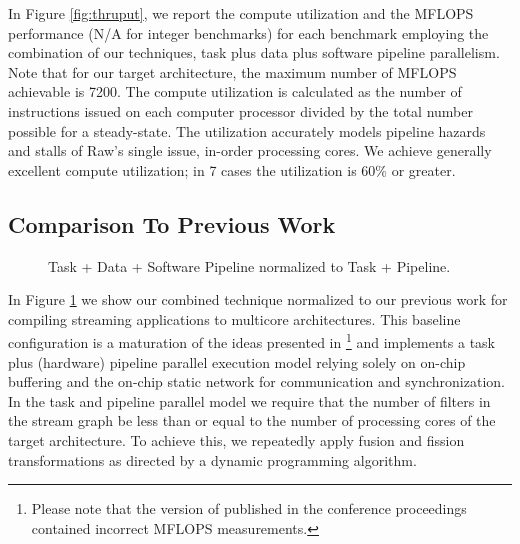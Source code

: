 In Figure \ref{fig:thruput}, we report the compute utilization and the
MFLOPS performance (N/A for integer benchmarks) for each benchmark
employing the combination of our techniques, task plus data plus
software pipeline parallelism. Note that for our target architecture,
the maximum number of MFLOPS achievable is 7200.  The compute
utilization is calculated as the number of instructions issued on each
computer processor divided by the total number possible for a
steady-state.  The utilization accurately models pipeline hazards and
stalls of Raw's single issue, in-order processing cores.  We achieve
generally excellent compute utilization; in 7 cases the utilization is
60\% or greater.


\subsection{Comparison To Previous Work}

\begin{figure}[t]
\centering
{}
\caption{Task + Data + Software Pipeline normalized to Task + Pipeline.
\protect\label{fig:vs-space}}
\vspace{-6pt}
\end{figure}

\begin{figure*}[t]
\centering
{}
\caption{Throughput Speedup Comparison and  Task + Data + Software Pipeline performance results.
\protect\label{fig:thruput}}
\vspace{-6pt}
\end{figure*}
In Figure \ref{fig:vs-space} we show our combined technique normalized
to our previous work for compiling streaming applications to multicore
architectures.  This baseline configuration is a maturation of the
ideas presented in \cite{streamit-asplos}\footnote{Please note that
the version of \cite{streamit-asplos} published in the conference
proceedings contained incorrect MFLOPS measurements.} and implements a
task plus (hardware) pipeline parallel execution model relying solely
on on-chip buffering and the on-chip static network for communication
and synchronization. In the task and pipeline parallel model we
require that the number of filters in the stream graph be less than or
equal to the number of processing cores of the target architecture.
To achieve this, we repeatedly apply fusion and fission
transformations as directed by a dynamic programming algorithm.

